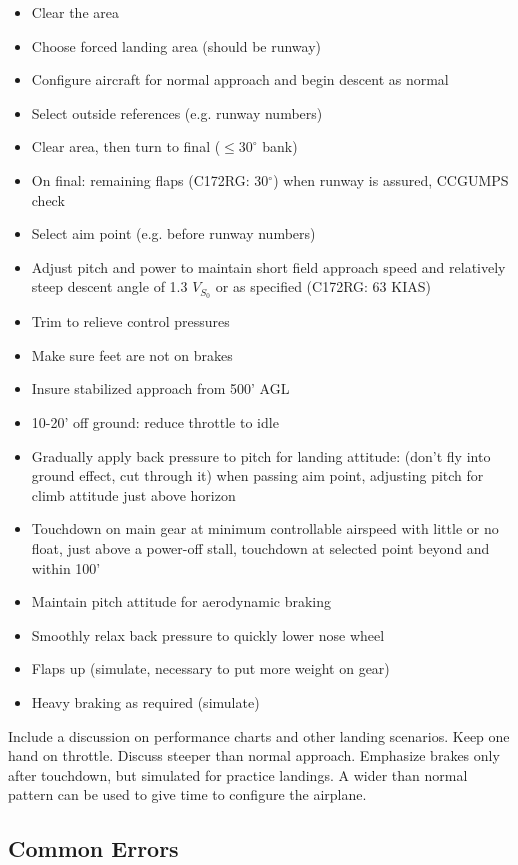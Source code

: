 \begin{itemize}
  \item Clear the area
  \item Choose forced landing area (should be runway)
  \item Configure aircraft for normal approach and begin descent as normal
  \item Select outside references (e.g. runway numbers)
  \item Clear area, then turn to final ($\leq 30^\circ$ bank)
  \item On final: remaining flaps (C172RG: 30$^\circ$) when runway is assured, CCGUMPS check
  \item Select aim point (e.g. before runway numbers)
  \item Adjust pitch and power to maintain short field approach speed and
    relatively steep descent angle of 1.3 $V_{S_0}$ or as specified (C172RG: 63
    KIAS)
  \item Trim to relieve control pressures
  \item Make sure feet are not on brakes
  \item Insure stabilized approach from 500' AGL
  \item 10-20' off ground: reduce throttle to idle
  \item Gradually apply back pressure to pitch for landing attitude: (don't fly
    into ground effect, cut through it) when passing aim point, adjusting
    pitch for climb attitude just above horizon
  \item Touchdown on main gear at minimum controllable airspeed with little or
    no float, just above a power-off stall, touchdown at selected point beyond
    and within 100'
  \item Maintain pitch attitude for aerodynamic braking
  \item Smoothly relax back pressure to quickly lower nose wheel
  \item Flaps up (simulate, necessary to put more weight on gear)
  \item Heavy braking as required (simulate)
\end{itemize}

Include a discussion on performance charts and other landing scenarios. Keep
one hand on throttle. Discuss steeper than normal approach. Emphasize brakes
only after touchdown, but simulated for practice landings. A wider than normal
pattern can be used to give time to configure the airplane.

\subsection{Common Errors}

